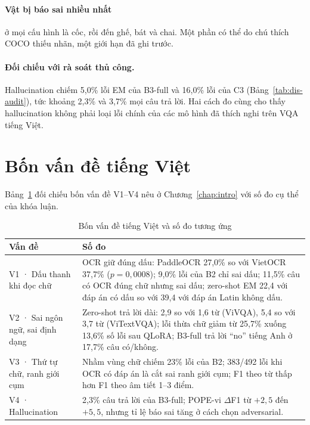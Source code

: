 \paragraph{Vật bị báo sai nhiều nhất} ở mọi cấu hình là cốc, rồi đến ghế, bát và
chai. Một phần có thể do chú thích COCO thiếu nhãn, một giới hạn đã ghi trước.

\paragraph{Đối chiếu với rà soát thủ công.} Hallucination chiếm 5,0\% lỗi EM của B3-full
và 16,0\% lỗi của C3 (Bảng~\ref{tab:dis-audit}), tức khoảng 2,3\% và 3,7\% mọi
câu trả lời. Hai cách đo cùng cho thấy hallucination không phải loại lỗi chính
của các mô hình đã thích nghi trên VQA tiếng Việt.

\section{Bốn vấn đề tiếng Việt}
\label{sec:dis-v}

Bảng~\ref{tab:dis-v} đối chiếu bốn vấn đề V1--V4 nêu ở Chương~\ref{chap:intro} với
số đo cụ thể của khóa luận.

\begin{table}[htbp]
\caption{Bốn vấn đề tiếng Việt và số đo tương ứng}
\label{tab:dis-v}
\centering
\small
\begin{tabular}{p{}p{}}
\toprule
\raggedright \textbf{Vấn đề} & \raggedright \textbf{Số đo} \tabularnewline
\midrule
V1 · Dấu thanh khi đọc chữ &
OCR giữ đúng dấu: PaddleOCR 27,0\% so với VietOCR 37,7\% ($p = 0{,}0008$); 9,0\%
lỗi của B2 chỉ sai dấu; 11,5\% câu có OCR đúng chữ nhưng sai dấu; zero-shot EM
22,4 với đáp án có dấu so với 39,4 với đáp án Latin không dấu. \\
V2 · Sai ngôn ngữ, sai định dạng &
Zero-shot trả lời dài: 2,9 so với 1,6 từ (ViVQA), 5,4 so với 3,7 từ (ViTextVQA);
lỗi thừa chữ giảm từ 25,7\% xuống 13,6\% số lỗi sau QLoRA; B3-full trả lời ``no''
tiếng Anh ở 17,7\% câu có/không. \\
V3 · Thứ tự chữ, ranh giới cụm &
Nhầm vùng chữ chiếm 23\% lỗi của B2; 383/492 lỗi khi OCR có đáp án là cắt sai
ranh giới cụm; F1 theo từ thấp hơn F1 theo âm tiết 1--3 điểm. \\
V4 · Hallucination &
2,3\% câu trả lời của B3-full; POPE-vi $\Delta$F1 từ $+2{,}5$ đến $+5{,}5$, nhưng
tỉ lệ báo sai tăng ở cách chọn adversarial. \\
\bottomrule
\end{tabular}
\end{table}

